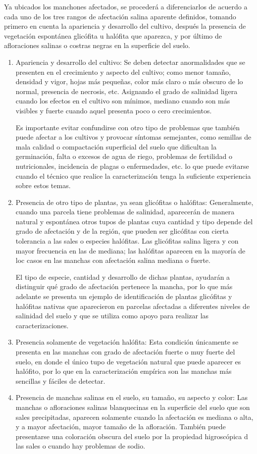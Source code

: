 Ya ubicados los manchones afectados, se procederá a diferenciarlos de acuerdo a cada uno de los tres rangos de afectación salina aparente definidos, tomando primero en cuenta la apariencia y desarrollo del cultivo, después la presencia de vegetación espontánea glicófita u halófita que aparezca, y por último de afloraciones salinas o costras negras en la superficie del suelo.
\begin{enumerate}
    \item Apariencia y desarrollo del cultivo: Se deben detectar anormalidades que se presenten en el crecimiento y aspecto del cultivo; como menor tamaño, densidad y vigor, hojas más pequeñas, color más claro o más obscuro de lo normal, presencia de necrosis, etc. Asignando el grado de salinidad ligera cuando los efectos en el cultivo son mínimos, mediano cuando son más visibles y fuerte cuando aquel presenta poco o cero crecimientos.
    
    Es importante evitar confundirse con otro tipo de problemas que también puede afectar a los cultivos y provocar síntomas semejantes, como semillas de mala calidad o compactación superficial del suelo que dificultan la germinación, falta o excesos de agua de riego, problemas de fertilidad o nutricionales, incidencia de plagas o enfermedades, etc. lo que puede evitarse cuando el técnico que realice la caracterización tenga la suficiente experiencia sobre estos temas.
    \item Presencia de otro tipo de plantas, ya sean glicófitas o halófitas: Generalmente, cuando una parcela tiene problemas de salinidad, aparecerán de manera natural y espontánea otros tupos de plantas cuya cantidad y tipo depende del grado de afectación y de la región, que pueden ser glicófitas con cierta tolerancia a las sales o especies halófitas. Las glicófitas salina ligera y con mayor frecuencia en las de mediana; las halófitas aparecen en la mayoría de loc casos en las manchas con afectación salina mediana o fuerte.
    
    El tipo de especie, cantidad y desarrollo de dichas plantas, ayudarán a distinguir qué grado de afectación pertenece la mancha, por lo que más adelante se presenta un ejemplo de identificación de plantas glicófitas y halófitas nativas que aparecieron en parcelas afectadas a diferentes niveles de salinidad del suelo y que se utiliza como apoyo para realizar las caracterizaciones.
    \item Presencia solamente de vegetación halófita: Esta condición únicamente se presenta en las manchas con grado de afectación fuerte o muy fuerte del suelo, en donde el único tupo de vegetación natural que puede aparecer es halófito, por lo que en la caracterización empírica son las manchas más sencillas y fáciles de detectar.
    \item Presencia de manchas salinas en el suelo, su tamaño, su aspecto y color: Las manchas o afloraciones salinas blanquecinas en la superficie del suelo que son sales precipitadas, aparecen solamente cuando la afectación es mediana o alta, y a mayor afectación, mayor tamaño de la afloración. También puede presentarse una coloración obscura del suelo por la propiedad higroscópica d las sales o cuando hay problemas de sodio.
\end{enumerate}
